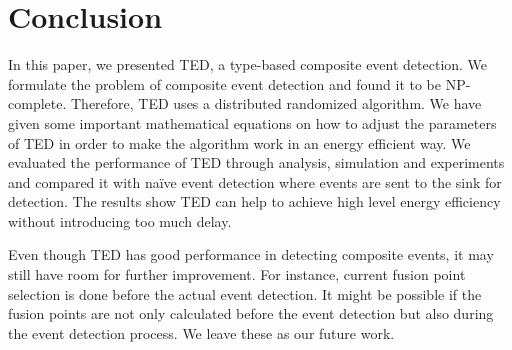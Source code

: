\section{Conclusion}
\label{sec:conclusion}
In this paper, we presented TED, a type-based composite event detection. We formulate the problem of composite event detection and found it to be NP-complete. Therefore, TED uses a distributed randomized algorithm. We have given some important mathematical equations on how to adjust the parameters of TED in order to make the algorithm work in an energy efficient way. We evaluated the performance of TED through analysis, simulation and experiments and compared it with na\"{i}ve event detection where events are sent to the sink for detection. The results show TED can help to achieve high level energy efficiency without introducing too much delay.

Even though TED has good performance in detecting composite events, it may still have room for further improvement. For instance, current fusion point selection is done before the actual event detection. It might be possible if the fusion points are not only calculated before the event detection but also during the event detection process. We leave these as our future work.
